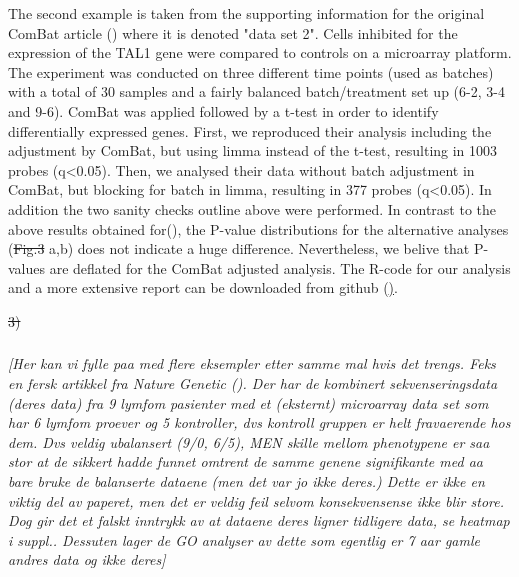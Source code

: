 \documentclass{bio}
\newcommand\NB[1]{\textcolor{NBcol}{\textit{#1}}} %
\newcommand\NOTE[1]{\NB{[#1]}} %
\providecommand{\DIFaddtex}[1]{{\protect\color{blue}\uwave{#1}}} %
\providecommand{\DIFdeltex}[1]{{\protect\color{red}\sout{#1}}}                      %
\providecommand{\DIFaddbegin}{} %
\providecommand{\DIFaddend}{} %
\providecommand{\DIFdelbegin}{} %
\providecommand{\DIFdelend}{} %
\providecommand{\DIFadd}[1]{\texorpdfstring{\DIFaddtex{#1}}{#1}} %
\providecommand{\DIFdel}[1]{\texorpdfstring{\DIFdeltex{#1}}{}} %
\begin{document}
\DIFaddend The second example is taken from the supporting information for the original ComBat article (\citealp{Johnson2007}) where it is denoted "data set 2". Cells inhibited for the expression of the TAL1 gene were compared to controls on a microarray platform. The experiment was conducted on three different time points (used as batches) with a total of 30 samples and a fairly balanced batch/treatment set up (6-2, 3-4 and 9-6). ComBat was applied followed by a t-test in order to identify differentially expressed genes. First, we reproduced their analysis including the adjustment by ComBat, but using limma instead of the t-test, resulting in 1003 probes (q<0.05).  Then, we analysed their data without batch adjustment in ComBat, but blocking for batch in limma, resulting in 377 probes (q<0.05). In addition the two sanity checks outline above were performed. In contrast to the above results obtained for(\citealp{Towfic2014}), the P-value distributions for the alternative analyses (\DIFdelbegin \DIFdel{Fig.3 }\DIFdelend \DIFaddbegin \DIFadd{Figure~\ref{fig:p-johnson} }\DIFaddend a,b) does not indicate a huge difference. Nevertheless, we belive that  P-values are deflated for the ComBat adjusted analysis. The R-code for our analysis and a more extensive report can be downloaded from github (\href{https://github.com/vegardny/combat_tests.git}).



\DIFdelbegin \DIFdel{3) }\DIFdelend \DIFaddbegin \subsubsection{\DIFadd{More?}}

\DIFaddend \NOTE{Her kan vi fylle paa med flere eksempler etter samme mal hvis det trengs. Feks en fersk artikkel fra Nature Genetic (\citealp{Yoo2014}). Der har de kombinert sekvenseringsdata  (deres data) fra 9 lymfom pasienter med et (eksternt) microarray data set som har 6 lymfom proever og 5 kontroller, dvs kontroll gruppen er helt fravaerende hos dem. Dvs veldig ubalansert (9/0, 6/5), MEN skille mellom phenotypene er saa stor at de sikkert hadde funnet omtrent de samme genene signifikante med aa bare bruke de balanserte dataene (men det var jo ikke deres.) Dette er ikke en viktig del av paperet, men det er veldig feil selvom konsekvensense ikke blir store. Dog gir det et falskt inntrykk av at dataene deres ligner tidligere data, se heatmap i suppl.. Dessuten lager de GO analyser av dette som egentlig er 7 aar gamle andres data og ikke deres}
\end{document}
